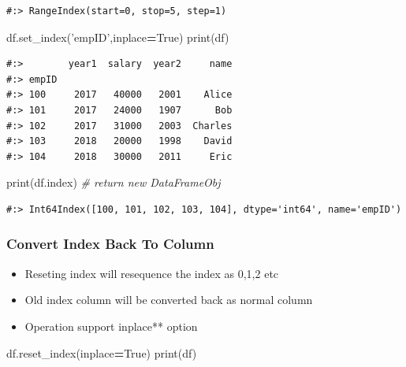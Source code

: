 \documentclass[
]{book}
\newenvironment{Shaded}{\begin{snugshade}}{\end{snugshade}}
\newcommand{\BuiltInTok}[1]{#1}
\newcommand{\CommentTok}[1]{\textcolor[rgb]{0.37,0.37,0.37}{\textit{#1}}}
\newcommand{\NormalTok}[1]{#1}
\newcommand{\OperatorTok}[1]{\textcolor[rgb]{0.43,0.43,0.43}{\textbf{#1}}}
\newcommand{\StringTok}[1]{\textcolor[rgb]{0.5,0.5,0.5}{#1}}
\newcommand{\VariableTok}[1]{\textcolor[rgb]{0,0,0}{#1}}
\providecommand{\tightlist}{%
  \setlength{\itemsep}{0pt}\setlength{\parskip}{0pt}}
\begin{document}
\begin{verbatim}
#:> RangeIndex(start=0, stop=5, step=1)
\end{verbatim}

\begin{Shaded}
\begin{Highlighting}[]
\NormalTok{df.set_index(}\StringTok{'empID'}\NormalTok{,inplace}\OperatorTok{=}\VariableTok{True}\NormalTok{) }
\BuiltInTok{print}\NormalTok{(df)}
\end{Highlighting}
\end{Shaded}

\begin{verbatim}
#:>        year1  salary  year2     name
#:> empID                               
#:> 100     2017   40000   2001    Alice
#:> 101     2017   24000   1907      Bob
#:> 102     2017   31000   2003  Charles
#:> 103     2018   20000   1998    David
#:> 104     2018   30000   2011     Eric
\end{verbatim}

\begin{Shaded}
\begin{Highlighting}[]
\BuiltInTok{print}\NormalTok{(df.index) }\CommentTok{# return new DataFrameObj}
\end{Highlighting}
\end{Shaded}

\begin{verbatim}
#:> Int64Index([100, 101, 102, 103, 104], dtype='int64', name='empID')
\end{verbatim}

\hypertarget{convert-index-back-to-column}{%
\subsubsection{Convert Index Back To Column}\label{convert-index-back-to-column}}

\begin{itemize}
\tightlist
\item
  Reseting index will resequence the index as 0,1,2 etc\\
\item
  Old index column will be converted back as normal column\\
\item
  Operation support inplace** option
\end{itemize}

\begin{Shaded}
\begin{Highlighting}[]
\NormalTok{df.reset_index(inplace}\OperatorTok{=}\VariableTok{True}\NormalTok{)}
\BuiltInTok{print}\NormalTok{(df)}
\end{Highlighting}
\end{Shaded}
\end{document}
